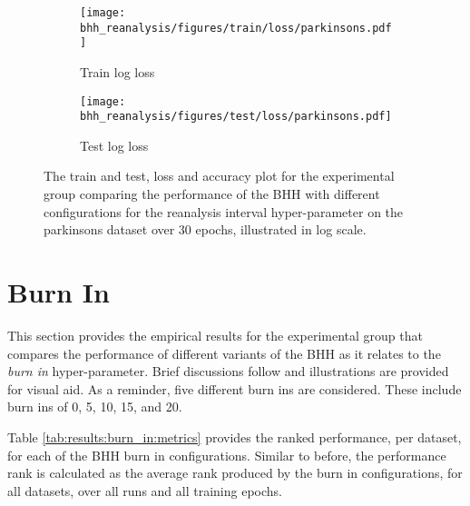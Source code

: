\begin{figure}[htbp]
	\begin{subfigure}{0.5\textwidth}
		\centering
		\texttt{[image: bhh\_reanalysis/figures/train/loss/parkinsons.pdf]}
		\caption{Train log loss}
		\label{fig:results:reanalysis:figures:loss:train:parkinsons}
	\end{subfigure}
	\begin{subfigure}{0.5\textwidth}
		\centering
		\texttt{[image: bhh\_reanalysis/figures/test/loss/parkinsons.pdf]}
		\caption{Test log loss}
		\label{fig:results:reanalysis:figures:loss:test:parkinsons}
	\end{subfigure}
	\par\bigskip
	\caption{The train and test, loss and accuracy plot for the experimental group comparing the performance of the \acs{BHH} with different configurations for the reanalysis interval hyper-parameter on the parkinsons dataset over 30 epochs, illustrated in log scale.}
	\label{fig:results:reanalysis:figures:parkinsons}
\end{figure}


\section{Burn In}\label{sec:results:burn_in}

This section provides the empirical results for the experimental group that compares the performance of different variants of the \acs{BHH} as it relates to the \textit{burn in} hyper-parameter. Brief discussions follow and illustrations are provided for visual aid. As a reminder, five different burn ins are considered. These include burn ins of 0, 5, 10, 15, and 20.

Table \ref{tab:results:burn_in:metrics} provides the ranked performance, per dataset, for each of the \acs{BHH} burn in configurations. Similar to before, the performance rank is calculated as the average rank produced by the burn in configurations, for all datasets, over all runs and all training epochs.

